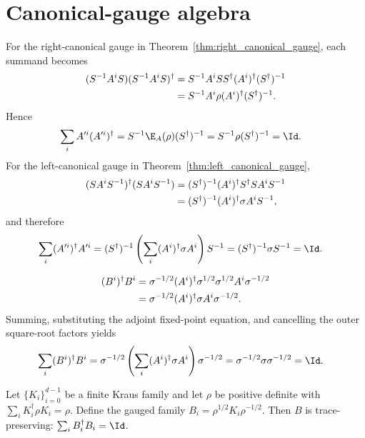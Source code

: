 \section{Canonical-gauge algebra}
\label{sec:app_qpf_gauge}

For the right-canonical gauge in
Theorem~\ref{thm:right_canonical_gauge}, each summand becomes
\begin{align}
    (S^{-1}A^iS)(S^{-1}A^iS)^\dagger
     & =S^{-1}A^iSS^\dagger(A^i)^\dagger(S^\dagger)^{-1}
    \notag                                               \\
     & =S^{-1}A^i\rho(A^i)^\dagger(S^\dagger)^{-1}.
    \notag
\end{align}
Hence
\begin{align}
    \sum_iA'^i(A'^i)^\dagger
     & =S^{-1}\E_A(\rho)(S^\dagger)^{-1}
    =S^{-1}\rho(S^\dagger)^{-1}
    =\Id.
    \notag
\end{align}
For the left-canonical gauge in Theorem~\ref{thm:left_canonical_gauge},
\begin{align}
    (SA^iS^{-1})^\dagger(SA^iS^{-1})
     & =(S^\dagger)^{-1}(A^i)^\dagger S^\dagger SA^iS^{-1}
    \notag                                                 \\
     & =(S^\dagger)^{-1}(A^i)^\dagger\sigma A^iS^{-1},
    \notag
\end{align}
and therefore
\begin{align}
    \sum_i(A'^i)^\dagger A'^i
     & =(S^\dagger)^{-1}
    \left(\sum_i(A^i)^\dagger\sigma A^i\right)S^{-1}
    =(S^\dagger)^{-1}\sigma S^{-1}
    =\Id.
    \notag
\end{align}

\begin{align}
    (B^i)^\dagger B^i
     & =\sigma^{-1/2}(A^i)^\dagger
    \sigma^{1/2}\sigma^{1/2}A^i\sigma^{-1/2}
    \notag                                                 \\
     & =\sigma^{-1/2}(A^i)^\dagger\sigma A^i\sigma^{-1/2}.
    \notag
\end{align}
Summing, substituting the adjoint fixed-point equation, and cancelling the
outer square-root factors yields
\begin{align}
    \sum_i(B^i)^\dagger B^i
     & =\sigma^{-1/2}
    \left(\sum_i(A^i)^\dagger\sigma A^i\right)\sigma^{-1/2}
    =\sigma^{-1/2}\sigma\sigma^{-1/2}
    =\Id.
    \notag
\end{align}

\begin{theorem}%
    \label{thm:kraus_tp_gauge_from_adjoint_fixed}
    \leanok
    Let $\{K_i\}_{i=0}^{d-1}$ be a finite Kraus family and let $\rho$ be
    positive definite with $\sum_i K_i^\dagger \rho K_i = \rho$. Define the
    gauged family $B_i = \rho^{1/2} K_i \rho^{-1/2}$. Then $B$ is
    trace-preserving: $\sum_i B_i^\dagger B_i = \Id$.
\end{theorem}

